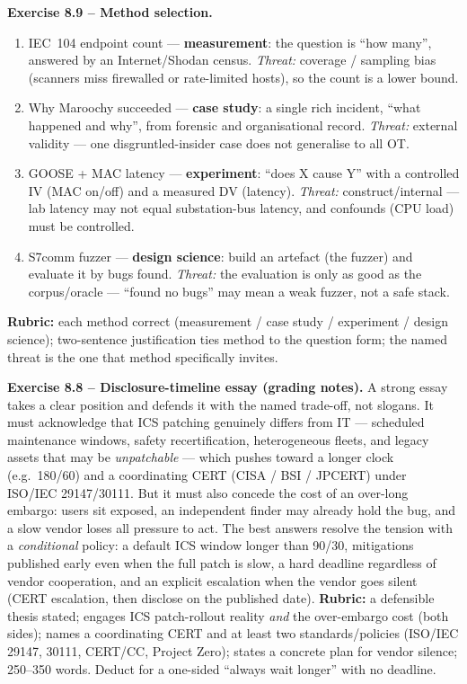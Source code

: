 \documentclass[11pt,a4paper]{article}
\begin{document}
\begin{solutionbox}
\textbf{Exercise 8.9 -- Method selection.}
\begin{enumerate}\setlength{\itemsep}{1pt}\small
  \item IEC~104 endpoint count --- \textbf{measurement}: the question is ``how
        many'', answered by an Internet/Shodan census. \emph{Threat:} coverage /
        sampling bias (scanners miss firewalled or rate-limited hosts), so the
        count is a lower bound.
  \item Why Maroochy succeeded --- \textbf{case study}: a single rich incident, ``what
        happened and why'', from forensic and organisational record. \emph{Threat:}
        external validity --- one disgruntled-insider case does not generalise to
        all OT.
  \item GOOSE + MAC latency --- \textbf{experiment}: ``does X cause Y'' with a
        controlled IV (MAC on/off) and a measured DV (latency). \emph{Threat:}
        construct/internal --- lab latency may not equal substation-bus latency, and
        confounds (CPU load) must be controlled.
  \item S7comm fuzzer --- \textbf{design science}: build an artefact (the fuzzer)
        and evaluate it by bugs found. \emph{Threat:} the evaluation is only as
        good as the corpus/oracle --- ``found no bugs'' may mean a weak fuzzer, not
        a safe stack.
\end{enumerate}
\textbf{Rubric:} each method correct (measurement / case study / experiment /
design science); two-sentence justification ties method to the question form; the
named threat is the one that method specifically invites.
\end{solutionbox}

\begin{solutionbox}
\textbf{Exercise 8.8 -- Disclosure-timeline essay (grading notes).}
A strong essay takes a clear position and defends it with the named trade-off, not
slogans. It must acknowledge that ICS patching genuinely differs from IT ---
scheduled maintenance windows, safety recertification, heterogeneous fleets, and
legacy assets that may be \emph{unpatchable} --- which pushes toward a longer clock
(e.g.\ 180/60) and a coordinating CERT (CISA / BSI / JPCERT) under ISO/IEC
29147/30111. But it must also concede the cost of an over-long embargo: users sit
exposed, an independent finder may already hold the bug, and a slow vendor loses all
pressure to act. The best answers resolve the tension with a \emph{conditional}
policy: a default ICS window longer than 90/30, mitigations published early even
when the full patch is slow, a hard deadline regardless of vendor cooperation, and
an explicit escalation when the vendor goes silent (CERT escalation, then disclose
on the published date). \textbf{Rubric:} a defensible thesis stated; engages ICS
patch-rollout reality \emph{and} the over-embargo cost (both sides); names a
coordinating CERT and at least two standards/policies (ISO/IEC 29147, 30111,
CERT/CC, Project Zero); states a concrete plan for vendor silence; 250--350 words.
Deduct for a one-sided ``always wait longer'' with no deadline.
\end{solutionbox}
\end{document}
